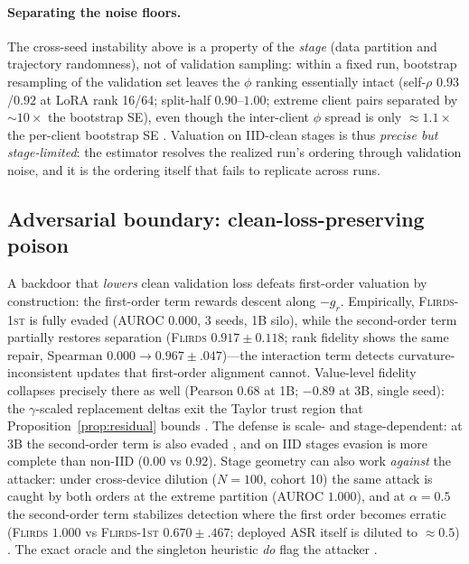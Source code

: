 \paragraph{Separating the noise floors.}
The cross-seed instability above is a property of the \emph{stage} (data
partition and trajectory randomness), not of validation sampling: within a
fixed run, bootstrap resampling of the validation set leaves the $\phi$
ranking essentially intact (self-$\rho$ $0.93$/$0.92$ at LoRA rank 16/64;
split-half $0.90$--$1.00$; extreme client pairs separated by
$\sim$$10\times$ the bootstrap SE), even though the inter-client $\phi$ spread
is only $\approx 1.1\times$ the per-client bootstrap SE
. Valuation on IID-clean stages
is thus \emph{precise but stage-limited}: the estimator resolves the realized
run's ordering through validation noise, and it is the ordering itself that
fails to replicate across runs.

\subsection{Adversarial boundary: clean-loss-preserving poison}
\label{sec:results-poison}

A backdoor that \emph{lowers} clean validation loss \citep{bagdasaryan2020}
defeats first-order valuation by construction: the first-order term rewards
descent along $-g_r$. Empirically, \textsc{Flirds-1st} is fully evaded (AUROC
$0.000$, 3 seeds, 1B silo), while the second-order term partially restores
separation (\textsc{Flirds} $0.917 \pm 0.118$; rank fidelity shows the same
repair, Spearman $0.000 \to 0.967 \pm .047$)---the interaction term detects
curvature-inconsistent updates that first-order alignment cannot. Value-level
fidelity collapses precisely there as well (Pearson $0.68$ at 1B; $-0.89$ at
3B, single seed): the $\gamma$-scaled replacement deltas exit the Taylor trust
region that Proposition~\ref{prop:residual} bounds . The defense is
scale- and stage-dependent: at 3B the second-order term is also evaded
, and on
IID stages evasion is more complete than non-IID ($0.00$ vs $0.92$).
Stage geometry can also work \emph{against} the attacker: under cross-device
dilution ($N{=}100$, cohort 10) the same attack is caught by both orders at
the extreme partition (AUROC $1.000$), and at $\alpha{=}0.5$ the second-order
term stabilizes detection where the first order becomes erratic
(\textsc{Flirds} $1.000$ vs \textsc{Flirds-1st} $0.670 \pm .467$; deployed ASR
itself is diluted to $\approx 0.5$) . The exact
oracle and the singleton heuristic \emph{do} flag the attacker
.

